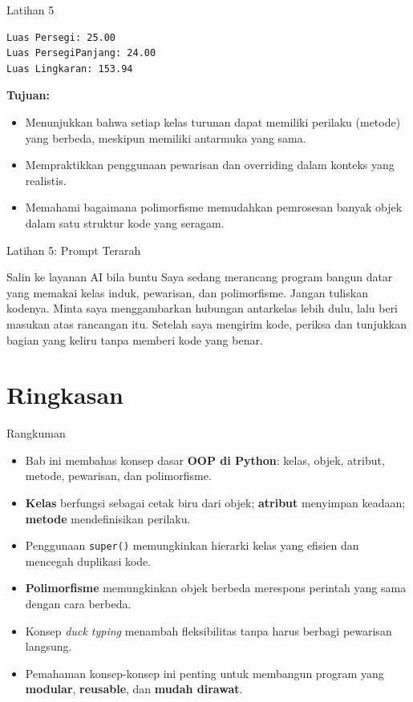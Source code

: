 \documentclass[aspectratio=169, table]{beamer}
\begin{document}
\begin{frame}[fragile,allowframebreaks=0.8]{Latihan 5}
\begin{lstlisting}[language=bash, breaklines=true, basicstyle=\ttfamily\scriptsize]
Luas Persegi: 25.00
Luas PersegiPanjang: 24.00
Luas Lingkaran: 153.94
\end{lstlisting}

\textbf{Tujuan:}
\begin{itemize}
    \item Menunjukkan bahwa setiap kelas turunan dapat memiliki perilaku (metode) yang berbeda, meskipun memiliki antarmuka yang sama.
    \item Mempraktikkan penggunaan pewarisan dan overriding dalam konteks yang realistis.
    \item Memahami bagaimana polimorfisme memudahkan pemrosesan banyak objek dalam satu struktur kode yang seragam.
\end{itemize}
\end{frame}

\begin{frame}{Latihan 5: Prompt Terarah}
\begin{block}{Salin ke layanan AI bila buntu}
\small Saya sedang merancang program bangun datar yang memakai kelas induk, pewarisan, dan polimorfisme. Jangan tuliskan kodenya. Minta saya menggambarkan hubungan antarkelas lebih dulu, lalu beri masukan atas rancangan itu. Setelah saya mengirim kode, periksa dan tunjukkan bagian yang keliru tanpa memberi kode yang benar.
\end{block}
\end{frame}

\section{Ringkasan}

\begin{frame}[fragile]{Rangkuman}
\vspace{20pt}
\begin{itemize}
    \item Bab ini membahas konsep dasar \textbf{OOP di Python}: kelas, objek, atribut, metode, pewarisan, dan polimorfisme.
    \item \textbf{Kelas} berfungsi sebagai cetak biru dari objek; \textbf{atribut} menyimpan keadaan; \textbf{metode} mendefinisikan perilaku.
    \item Penggunaan \texttt{super()} memungkinkan hierarki kelas yang efisien dan mencegah duplikasi kode.
    \item \textbf{Polimorfisme} memungkinkan objek berbeda merespons perintah yang sama dengan cara berbeda.
    \item Konsep \emph{duck typing} menambah fleksibilitas tanpa harus berbagi pewarisan langsung.
    \item Pemahaman konsep-konsep ini penting untuk membangun program yang \textbf{modular}, \textbf{reusable}, dan \textbf{mudah dirawat}.
\end{itemize}
\end{frame}
\end{document}
